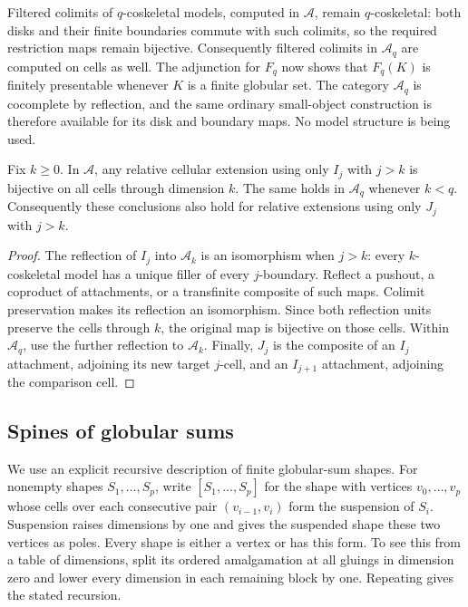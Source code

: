Filtered colimits of $q$-coskeletal models, computed in
$\mathcal A$, remain $q$-coskeletal: both disks and their finite
boundaries commute with such colimits, so the required restriction
maps remain bijective.  Consequently filtered colimits in
$\mathcal A_q$ are computed on cells as well.  The adjunction for
$F_q$ now shows that $F_q(K)$ is finitely presentable whenever $K$
is a finite globular set.  The category $\mathcal A_q$ is
cocomplete by reflection, and the same ordinary small-object
construction is therefore available for its disk and boundary
maps.  No model structure is being used.

\begin{lemma}
\label{lem:high-cells}
Fix $k\geq0$.  In $\mathcal A$, any relative cellular extension using
only $I_j$ with $j>k$ is bijective on all cells through dimension $k$.
The same holds in $\mathcal A_q$ whenever $k<q$.  Consequently these
conclusions also hold for relative extensions using only $J_j$
with $j>k$.
\end{lemma}

\begin{proof}
The reflection of $I_j$ into $\mathcal A_k$ is an isomorphism when
$j>k$: every $k$-coskeletal model has a unique filler of every
$j$-boundary.  Reflect a pushout, a coproduct of attachments, or a
transfinite composite of such maps.  Colimit preservation makes its
reflection an isomorphism.  Since both reflection units preserve
the cells through $k$, the original map is bijective on those cells.
Within $\mathcal A_q$, use the further reflection to $\mathcal A_k$.
Finally, $J_j$ is the composite of an $I_j$ attachment, adjoining its
new target $j$-cell, and an $I_{j+1}$ attachment, adjoining the
comparison cell.
\end{proof}

\subsection{Spines of globular sums}

We use an explicit recursive description of finite globular-sum
shapes.  For nonempty shapes $S_1,\ldots,S_p$, write
$[S_1,\ldots,S_p]$ for the shape with vertices
$v_0,\ldots,v_p$ whose cells over each consecutive pair
$(v_{i-1},v_i)$ form the suspension of $S_i$.  Suspension raises
dimensions by one and gives the suspended shape these two vertices
as poles.  Every shape is either a vertex or has this form.  To see
this from a table of dimensions, split its ordered amalgamation at
all gluings in dimension zero and lower every dimension in each
remaining block by one.  Repeating gives the stated recursion.

